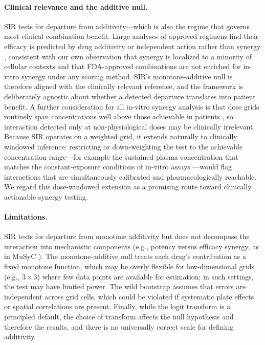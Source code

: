 \documentclass[pdflatex,sn-nature]{sn-jnl}%
\begin{document}
\paragraph{Clinical relevance and the additive null.}
SIR tests for departure from additivity---which is also the regime that governs most clinical combination benefit. Large analyses of approved regimens find their efficacy is predicted by drug additivity or independent action rather than synergy \cite{PalmerSorger2017,LingHuang2020}, consistent with our own observation that synergy is localized to a minority of cellular contexts and that FDA-approved combinations are not enriched for in-vitro synergy under any scoring method. SIR's monotone-additive null is therefore aligned with the clinically relevant reference, and the framework is deliberately agnostic about whether a detected departure translates into patient benefit. A further consideration for all in-vitro synergy analysis is that dose grids routinely span concentrations well above those achievable in patients \cite{ListonDavis2017}, so interaction detected only at non-physiological doses may be clinically irrelevant. Because SIR operates on a weighted grid, it extends naturally to clinically windowed inference: restricting or down-weighting the test to the achievable concentration range---for example the sustained plasma concentration that matches the constant-exposure conditions of in-vitro assays \cite{LingHuang2020}---would flag interactions that are simultaneously calibrated and pharmacologically reachable. We regard this dose-windowed extension as a promising route toward clinically actionable synergy testing.

\paragraph{Limitations.}
SIR tests for departure from monotone additivity but does not decompose the interaction into mechanistic components (e.g., potency versus efficacy synergy, as in MuSyC \cite{MuSyC2021}).
The monotone-additive null treats each drug's contribution as a fixed monotone function, which may be overly flexible for low-dimensional grids (e.g., $3\times 3$) where few data points are available for estimation; in such settings, the test may have limited power.
The wild bootstrap assumes that errors are independent across grid cells, which could be violated if systematic plate effects or spatial correlations are present.
Finally, while the logit transform is a principled default, the choice of transform affects the null hypothesis and therefore the results, and there is no universally correct scale for defining additivity.
\end{document}
